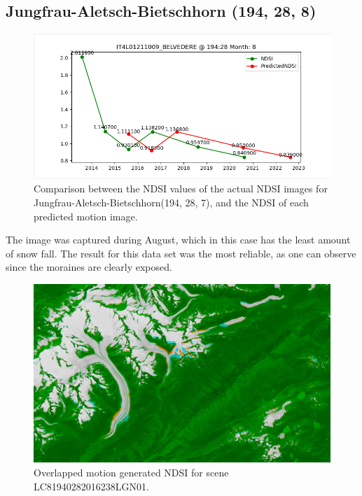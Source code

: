 \documentclass[12pt, a4paper]{report}
\begin{document}
	
	\newpage{}
	
	\subsection{Jungfrau-Aletsch-Bietschhorn (194, 28, 8)}
	
	\begin{figure}[h!]
		\centering
		\includegraphics[width=\linewidth]{../images/experiment_194288.png}
		\caption{Comparison between the NDSI values of the actual NDSI images for Jungfrau-Aletsch-Bietschhorn(194, 28, 7), and the NDSI of each predicted motion image.}
		\label{fig:jungfrau_194288}
	\end{figure}
	
	The image was captured during August, which in this case has the least amount of snow fall. The result for this data set was the most reliable, as one can observe since the moraines are clearly exposed. 
	
	\begin{figure}[h!]
		\centering
		\includegraphics[width=\linewidth]{../images/experiment_1940288_image.png}
		\caption{Overlapped motion generated NDSI for scene LC81940282016238LGN01.}
		\label{fig:experiment_1940288_image}
	\end{figure}
	
\end{document}
